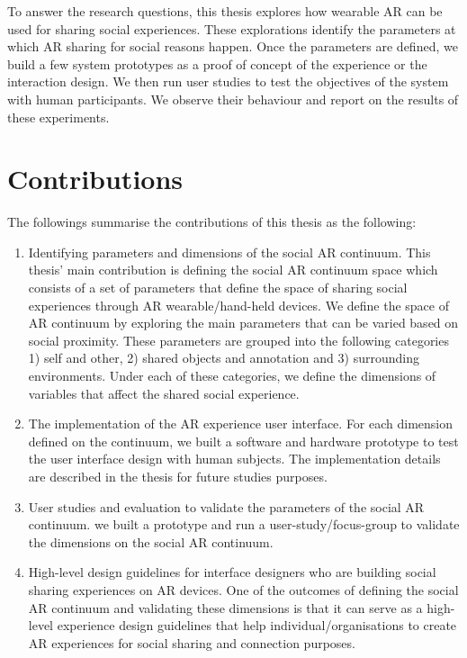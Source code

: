 To answer the research questions, this thesis explores how wearable AR can be used for sharing social experiences. These explorations identify the parameters at which AR sharing for social reasons happen. Once the parameters are defined, we build a few system prototypes as a proof of concept of the experience or the interaction design. We then run user studies to test the objectives of the system with human participants. We observe their behaviour and report on the results of these experiments. 

\section{Contributions}

The followings summarise the contributions of this thesis as the following: 

\begin{enumerate}
    \item Identifying parameters and dimensions of the social AR continuum. This thesis' main contribution is defining the social AR continuum space which consists of a set of parameters that define the space of sharing social experiences through AR wearable/hand-held devices. We define the space of AR continuum by exploring the main parameters that can be varied based on social proximity. These parameters are grouped into the following categories 1) self and other, 2) shared objects and annotation and 3) surrounding environments. Under each of these categories, we define the dimensions of variables that affect the shared social experience.
    
    \item The implementation of the AR experience user interface. For each dimension defined on the continuum, we built a software and hardware prototype to test the user interface design with human subjects. The implementation details are described in the thesis for future studies purposes.
    
    \item User studies and evaluation to validate the parameters of the social AR continuum.  we built a prototype and run a user-study/focus-group to validate the dimensions on the social AR continuum. 
    
    \item High-level design guidelines for interface designers who are building social sharing experiences on AR devices. One of the outcomes of defining the social AR continuum and validating these dimensions is that it can serve as a high-level experience design guidelines that help individual/organisations to create AR experiences for social sharing and connection purposes.
\end{enumerate}

